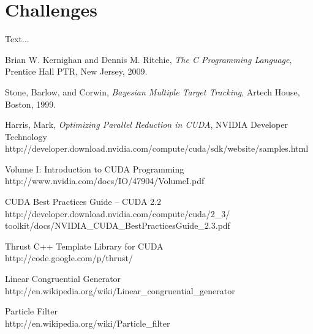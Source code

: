 \documentclass{article}
\begin{document}
\section{Challenges}
Text...

\begin{thebibliography}{9}

  Brian W. Kernighan and Dennis M. Ritchie,
  \emph{The C Programming Language},
  Prentice Hall PTR, New Jersey,
  2009.

  Stone, Barlow, and Corwin,
  \emph{Bayesian Multiple Target Tracking},
  Artech House, Boston,
  1999.

   Harris, Mark,
   \emph{Optimizing Parallel Reduction in CUDA},
   NVIDIA Developer Technology \\
   http://developer.download.nvidia.com/compute/cuda/sdk/website/samples.html

   Volume I: Introduction to CUDA Programming \\
   http://www.nvidia.com/docs/IO/47904/VolumeI.pdf

   CUDA Best Practices Guide -- CUDA 2.2\\
   http://developer.download.nvidia.com/compute/cuda/2\_3/\\
   toolkit/docs/NVIDIA\_CUDA\_BestPracticesGuide\_2.3.pdf

   Thrust C++ Template Library for CUDA \\
   http://code.google.com/p/thrust/

   Linear Congruential Generator \\
   http://en.wikipedia.org/wiki/Linear\_congruential\_generator

   Particle Filter \\
   http://en.wikipedia.org/wiki/Particle\_filter

\end{thebibliography}
\end{document}
